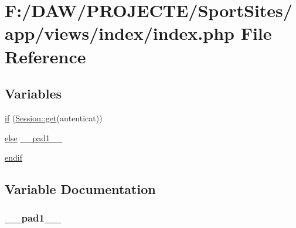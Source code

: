\hypertarget{app_2views_2index_2index_8php}{}\section{F\+:/\+D\+A\+W/\+P\+R\+O\+J\+E\+C\+T\+E/\+Sport\+Sites/app/views/index/index.php File Reference}
\label{app_2views_2index_2index_8php}
\subsection*{Variables}
\begin{DoxyCompactItemize}
\item 
\hyperlink{app_2views_2index_2index_8php_af71ebd4d252438a1590e85e150ce8954}{if} (\hyperlink{class_session_acf4e501ef0dfb6e98762fbecc9d75b9a}{Session\+::get}(\textquotesingle{}autenticat\textquotesingle{}))
\item 
\hyperlink{header_8php_ae69d798cba64778886b1a564b11f2793}{else} \hyperlink{app_2views_2index_2index_8php_ae8b4bb1441c6ab4dcb28a37bc46c8ead}{\+\_\+\+\_\+pad1\+\_\+\+\_\+}
\item 
\hyperlink{app_2views_2index_2index_8php_a82cd33ca97ff99f2fcc5e9c81d65251b}{endif}
\end{DoxyCompactItemize}


\subsection{Variable Documentation}
\hypertarget{app_2views_2index_2index_8php_ae8b4bb1441c6ab4dcb28a37bc46c8ead}{}
\subsubsection[{\+\_\+\+\_\+pad1\+\_\+\+\_\+}]{ \+\_\+\+\_\+pad1\+\_\+\+\_\+}\label{app_2views_2index_2index_8php_ae8b4bb1441c6ab4dcb28a37bc46c8ead}
\hypertarget{app_2views_2index_2index_8php_a82cd33ca97ff99f2fcc5e9c81d65251b}{}
